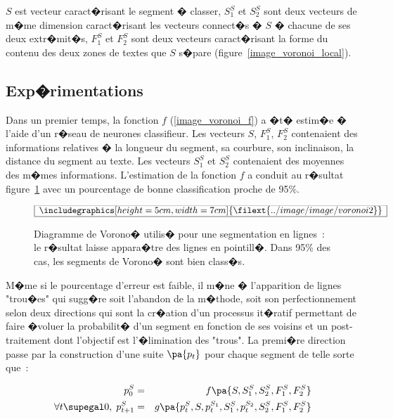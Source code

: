 $S$ est vecteur caract�risant le segment � classer, $S^S_1$ et $S^S_2$ sont deux vecteurs de m�me dimension caract�risant les vecteurs connect�s � $S$ � chacune de ses deux extr�mit�s, $F^S_1$ et $F^S_2$ sont deux vecteurs caract�risant la forme du contenu des deux zones de textes que $S$ s�pare (figure~\ref{image_voronoi_local}). 
            



\subsection{Exp�rimentations}


Dans un premier temps, la fonction $f$ (\ref{image_voronoi_f}) a �t� estim�e � l'aide d'un r�seau de neurones classifieur. Les vecteurs $S$, $F^S_1$, $F^S_2$ contenaient des informations relatives � la longueur du segment, sa courbure, son inclinaison, la distance du segment au texte. Les vecteurs $S^S_1$ et $S^S_2$ contenaient des moyennes des m�mes informations. L'estimation de la fonction $f$ a conduit au r�sultat figure~\ref{image_voronoi2} avec un pourcentage de bonne classification proche de 95\%.

            \begin{figure}[ht]
        $$\frame{$\begin{array}[c]{c}\includegraphics[height=5cm, width=7cm]
        {\filext{../image/image/voronoi2}}\end{array}$}$$
        \caption{    Diagramme de Vorono� utilis� pour une segmentation en lignes~: 
                            le r�sultat laisse appara�tre des lignes
                            en pointill�. Dans 95\% des cas, les segments de Vorono� sont bien class�s.}
        \label{image_voronoi2}
            \end{figure}
            
M�me si le pourcentage d'erreur est faible, il m�ne � l'apparition de lignes "trou�es" qui sugg�re soit l'abandon de la m�thode, soit son perfectionnement selon deux directions qui sont la cr�ation d'un processus it�ratif permettant de faire �voluer la probabilit� d'un segment en fonction de ses voisins et un post-traitement dont l'objectif est l'�limination des "trous". La premi�re direction passe par la construction d'une suite $\pa{p_t}$ pour chaque segment de telle sorte que~:

            \begin{eqnarray*}
            p^S_0 &=& f\pa{S, S^S_1, S^S_2, F^S_1, F^S_2} \\
            \forall t \supegal 0, \; p^S_{t+1} &=& g\pa{p^S_t, S, p^{S_1}_t, S^S_1, p^{S_2}_t, S^S_2, F^S_1, F^S_2}
            \end{eqnarray*}
            
